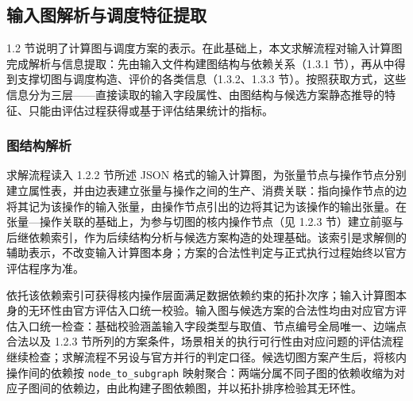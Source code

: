 \subsection{输入图解析与调度特征提取}
1.2 节说明了计算图与调度方案的表示。在此基础上，本文求解流程对输入计算图完成解析与信息提取：先由输入文件构建图结构与依赖关系（1.3.1 节），再从中得到支撑切图与调度构造、评价的各类信息（1.3.2、1.3.3 节）。按照获取方式，这些信息分为三层——直接读取的输入字段属性、由图结构与候选方案静态推导的特征、只能由评估过程获得或基于评估结果统计的指标。

\subsubsection{图结构解析}
求解流程读入 1.2.2 节所述 JSON 格式的输入计算图，为张量节点与操作节点分别建立属性表，并由边表建立张量与操作之间的生产、消费关联：指向操作节点的边将其记为该操作的输入张量，由操作节点引出的边将其记为该操作的输出张量。在张量—操作关联的基础上，为参与切图的核内操作节点（见 1.2.3 节）建立前驱与后继依赖索引，作为后续结构分析与候选方案构造的处理基础。该索引是求解侧的辅助表示，不改变输入计算图本身；方案的合法性判定与正式执行过程始终以官方评估程序为准。

依托该依赖索引可获得核内操作层面满足数据依赖约束的拓扑次序；输入计算图本身的无环性由官方评估入口统一校验。输入图与候选方案的合法性均由对应官方评估入口统一检查：基础校验涵盖输入字段类型与取值、节点编号全局唯一、边端点合法以及 1.2.3 节所列的方案条件，场景相关的执行可行性由对应问题的评估流程继续检查；求解流程不另设与官方并行的判定口径。候选切图方案产生后，将核内操作间的依赖按 \texttt{node\_to\_subgraph} 映射聚合：两端分属不同子图的依赖收缩为对应子图间的依赖边，由此构建子图依赖图，并以拓扑排序检验其无环性。

